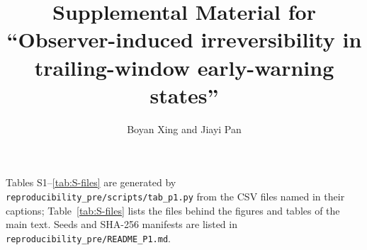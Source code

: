 \documentclass[10pt]{article}
\title{Supplemental Material for ``Observer-induced irreversibility in trailing-window early-warning states''}
\author{Boyan Xing and Jiayi Pan}
\date{}
\makeatletter
\newcommand{\Mref}[1]{\ifcsname main@#1\endcsname\csname main@#1\endcsname\else ??\fi}
\makeatother
\begin{document}
\maketitle
\noindent Tables S1--\ref{tab:S-files} are generated by \nolinkurl{reproducibility_pre/scripts/tab_p1.py} from the CSV files named in their captions; Table~\ref{tab:S-files} lists the files behind the figures and tables of the main text. Seeds and SHA-256 manifests are listed in \nolinkurl{reproducibility_pre/README_P1.md}.

\begin{table}[h]\centering
\caption{Data checks (\nolinkurl{E1b_splice_report.csv}, \nolinkurl{E1d_archive_check.csv}, \nolinkurl{E1e_repair_log.csv}). The analysis file is the vega-datasets snapshot to 17 April 2020 continued with the Yahoo download; the data gate (\nolinkurl{E1c_data_sanity.py}) rejects non-positive prices and volumes. The one patched volume is the value reported by Tonghuashun ($3739.16\times10^4$ lots of 100 shares); replacing it by the mean of the adjacent days changes no fitted quantity by more than \VolMaxDiff (\nolinkurl{E4g_volume_sensitivity.csv}).}\label{tab:S-data}
{\footnotesize}
\end{table}

\begin{table}[h]\centering
\caption{Proposition~\Mref{prop:decomp} with linear windows of $r_t$ and $r_t^2$ on S\&P 500 data: antisymmetry measured on the window series and computed from the empirical cross-covariances, with its observer and physical terms, for the data and the time-reversed data (\nolinkurl{E4c_linear_decomposition.csv}).}\label{tab:S-prop1}
{\small}
\end{table}

\begin{table}[h]\centering
\caption{Gaussian observer, closed forms against simulation. Top: $C(s)$ for $\phi=0.98$, windows (5,20), ten $10^6$-step simulations. Bottom: flux-to-drift ratio $R$, entropy production and Markov divergence of the fitted OU model, closed form against $3\times10^5$-step simulations, and plug-in symbolic divergences (\nolinkurl{T2_cov_check.csv}, \nolinkurl{S2_gaussian_irrev.csv}; script \nolinkurl{T2_gaussian_observer.py}). The Monte Carlo loss of the exact Bayes observer agrees with Eq.~(\Mref{eq:mehler}) of the main text to within \MCDevMax of $\mathrm{Var}\,p_{\rm op}$ for $\phi\le0.98$; at $\phi=0.99$ it is lower by up to \MCDevNineNine because a path holds only about $10^3$ independent samples (\nolinkurl{S1_gaussian_leak.csv}).}\label{tab:S-gauss}
{\small}\par\medskip
{\scriptsize}
\end{table}
\end{document}
